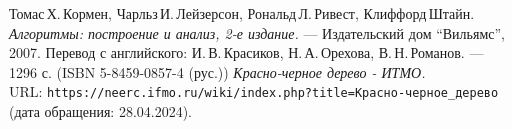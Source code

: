 \begin{thebibliography}{99}
    Томас\,Х.\,Кормен, Чарльз\,И.\,Лейзерсон, Рональд\,Л.\,Ривест, Клиффорд\,Штайн.
    {\itshape Алгоритмы: построение и анализ, 2-е издание.} --- Издательский дом \enquote{Вильямс}, 2007. Перевод с английского: И.\,В.\,Красиков, Н.\,А.\,Орехова, В.\,Н.\,Романов. --- 1296 с. (ISBN 5-8459-0857-4 (рус.))
    {\itshape Красно-черное дерево - ИТМО.} \\URL: \texttt{https://neerc.ifmo.ru/wiki/index.php?title=Красно-черное\_дерево} (дата обращения: 28.04.2024).
    \end{thebibliography}
    \pagebreak
    
    
    